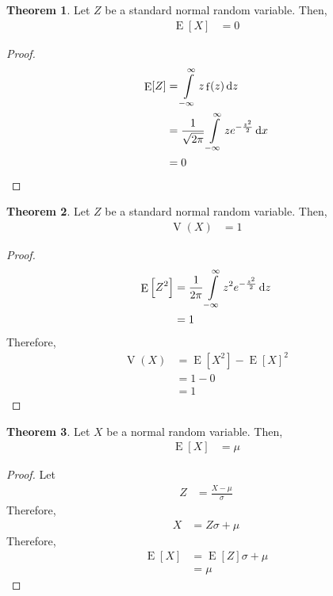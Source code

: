 \documentclass[titlepage, fleqn, a4paper, 12pt, twoside]{article}
\theoremstyle{definition}
\theoremstyle{theorem}
\newtheorem{theorem}{Theorem}
\DeclareMathOperator{\expct}{\mathrm{E}}
\DeclareMathOperator{\var}{\mathrm{V}}
\DeclareMathOperator{\pdf}{\mathrm{f}}
\begin{document}
\begin{theorem}
	Let $Z$ be a standard normal random variable.
	Then,
	\begin{align*}
		\expct[X] &= 0
	\end{align*}
\end{theorem}

\begin{proof}
	\begin{align*}
		\expct[Z] &= \int\limits_{-\infty}^{\infty} z \pdf(z) \dif z\\
		&= \frac{1}{\sqrt{2 \pi}} \int\limits_{-\infty}^{\infty} z e^{-\frac{z^2}{2}} \dif x\\
		&= 0
	\end{align*}
\end{proof}

\begin{theorem}
	Let $Z$ be a standard normal random variable.
	Then,
	\begin{align*}
		\var(X) &= 1
	\end{align*}
\end{theorem}

\begin{proof}
	\begin{align*}
		\expct\left[ Z^2 \right] &= \frac{1}{2 \pi} \int\limits_{-\infty}^{\infty} z^2 e^{-\frac{z^2}{2}} \dif z\\
		&= 1
	\end{align*}
	Therefore,
	\begin{align*}
		\var(X) &= \expct\left[ X^2 \right] - \expct[X]^2\\
		&= 1 - 0\\
		&= 1
	\end{align*}
\end{proof}

\begin{theorem}
	Let $X$ be a normal random variable.
	Then,
	\begin{align*}
		\expct[X] &= \mu
	\end{align*}
\end{theorem}

\begin{proof}
	Let
	\begin{align*}
		Z &= \frac{X - \mu}{\sigma}
	\end{align*}
	Therefore,
	\begin{align*}
		X &= Z \sigma + \mu
	\end{align*}
	Therefore,
	\begin{align*}
		\expct[X] &= \expct[Z] \sigma + \mu\\
		&= \mu
	\end{align*}
\end{proof}
\end{document}
